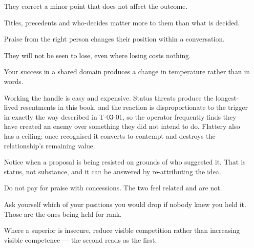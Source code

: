 \begin{feedback}
  \item They correct a minor point that does not affect the outcome.
  \item Titles, precedents and who-decides matter more to them than what is decided.
  \item Praise from the right person changes their position within a conversation.
  \item They will not be seen to lose, even where losing costs nothing.
  \item Your success in a shared domain produces a change in temperature rather than in words.
\end{feedback}

\begin{failure}
Working the handle is easy and expensive. Status threats produce the longest-lived resentments in this book, and the reaction is disproportionate to the trigger in exactly the way described in T-03-01, so the operator frequently finds they have created an enemy over something they did not intend to do. Flattery also has a ceiling: once recognised it converts to contempt and destroys the relationship's remaining value.
\end{failure}

\begin{countermeasures}
  \item Notice when a proposal is being resisted on grounds of who suggested it. That is status, not substance, and it can be answered by re-attributing the idea.
  \item Do not pay for praise with concessions. The two feel related and are not.
  \item Ask yourself which of your positions you would drop if nobody knew you held it. Those are the ones being held for rank.
  \item Where a superior is insecure, reduce visible competition rather than increasing visible competence --- the second reads as the first.
\end{countermeasures}

\seesources
{}
